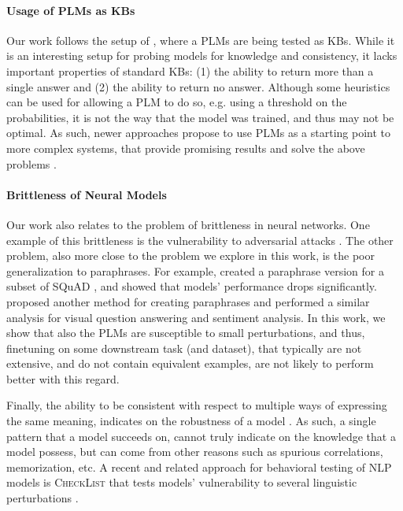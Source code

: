 \paragraph{Usage of PLMs as KBs}
Our work follows the setup of \citet{lama,alpaqa}, where a PLMs are being tested as KBs. While it is an interesting setup for probing models for knowledge and consistency, it lacks important properties of standard KBs: (1) the ability to return more than a single answer and (2) the ability to return no answer.
Although some heuristics can be used for allowing a PLM to do so, e.g. using a threshold on the probabilities, it is not the way that the model was trained, and thus may not be optimal.
As such, newer approaches propose to use PLMs as a starting point to more complex systems, that provide promising results and solve the above problems \cite{thorne2020neural}.


\paragraph{Brittleness of Neural Models}
Our work also relates to the problem of brittleness in neural networks. One example of this brittleness is the vulnerability to adversarial attacks \cite{adversarial_attacks,jia2017adversarial}.
The other problem, also more close to the problem we explore in this work, is the poor generalization to paraphrases.
For example, \citet{squad-paraphrase} created a paraphrase version for a subset of SQuAD \cite{squad}, and showed that models' performance drops significantly. 
\citet{ribeiro2018semantically} proposed another method for creating paraphrases and performed a similar analysis for visual question answering and sentiment analysis.
In this work, we show that also the PLMs are susceptible to small perturbations, and thus, finetuning on some downstream task (and dataset), that typically are not extensive, and do not contain equivalent examples, are not likely to perform better with this regard.

Finally, the ability to be consistent with respect to multiple ways of expressing the same meaning, indicates on the robustness of a model . As such, a single pattern that a model succeeds on, cannot truly indicate on the knowledge that a model possess, but can come from other reasons such as spurious correlations, memorization, etc. A recent and related approach for behavioral testing of NLP models is \textsc{CheckList} that tests models' vulnerability to several linguistic perturbations \cite{ribeiro-etal-2020-beyond}.
